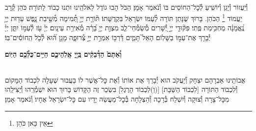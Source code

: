\documentclass[twoside, openany, parskip=half, 11pt]{book}
\begin{document}
\avharachamim

\\
וְ֯יַעֲזוֹר וְ֯יָגֵן וְ֯יוֹשִֽׁיעַ לְ֯כׇל־הַחוֹסִים בּוֹ וְ֯נֹאמַר אָמֵן׃
הַכֹּל הָבוּ גוֹדֶל לֵאלֹהֵֽינוּ וּתְנוּ כָבוֹד לַתּוֹרָה׃ כֹּהֵן קְ֯רָב יַעֲמוֹד
\footnote{ אֵין כַּאן כֹּהֵן}
הַכֹּהֵן. בָּרוּךְ שֶׁנָּתַן תּוֹרָה לְ֯עַמּוֹ יִשְׂרָאֵל בִּקְדֻשָּׁתוֹ׃
תּ֘וֹרַ֤ת יְיָ֣ תְּ֭֯מִימָה מְ֯שִׁ֣יבַת נָ֑פֶשׁ עֵד֖וּת יְיָ֥ נֶֽ֝אֱמָנָ֗ה מַחְכִּ֥ימַת פֶּֽתִי׃ פִּקּ֘וּדֵ֤י יְיָ֣ יְ֭֯שָׁרִים מְ֯שַׂמְּ֯חֵי־לֵ֑ב מִצְוַ֖ת יְיָ֥ בָּ֝רָ֗ה מְ֯אִירַ֥ת עֵינָֽיִם׃
יְיָ֗ עֹ֖ז לְ֯עַמּ֣וֹ יִתֵּ֑ן יְיָ֓ יְ֯בָרֵ֖ךְ אֶת־עַמּ֣וֹ בַשָּׁלֽוֹם׃
הָאֵל֮ תָּמִ֢ים דַּ֫רְכּ֥וֹ אִמְרַ֣ת יְיָ֣ צְ֯רוּפָ֑ה מָגֵ֥ן ה֝֗וּא לְ֯כֹ֤ל הַֽחוֹסִ֬ים־בּֽוֹ׃


\textbf{וְ֯אַתֶּם֙ הַדְּ֯בֵקִ֔ים בַּֽיְ֖יָ אֱלֹֽהֵיכֶ֑ם חַיִּ֥ים־כֻּלְּ֯כֶ֖ם הַיּֽוֹם׃} 

\nextpage

\torahbarachu

\hagomel

\\
אֲבוֹתֵֽינוּ אַבְרָהָם יִצְחָק וְ֯יַעֲקֹב הוּא יְ֯בָרֵךְ אֶת
אוֹתוֹ וְ֯אֶת כׇּל־אֲשֶׁר לוֹ
בַּעֲבוּר שֶׁעָלָה לִכְבוֹד הַמָּקוֹם וְ֯לִכְבוֹד הַתּוֹרָה
[לִכְבוֹד הַשַּׁבָּת]
[(וְ)לִכְבוֹד הָרֶגֶל]
בִּשְׂכַר זֶה הַקָּדוֹשׁ בָּרוּךְ הוּא יִשְׁמְ֯רֵֽהוּ וְ֯יַצִּילֵֽהוּ מִכׇּל־צָרָה וְ֯צוּקָה וְ֯יִשְׁלַח בְּ֯רָכָה וְ֯הַצְלָחָה בְּ֯כׇל־מַעֲשֵׂה יָדָיו עִם כׇּל־יִשְׂרָאֵל אֶחָיו׃ וְ֯נֹאמַר אָמֵן׃
\end{document}
